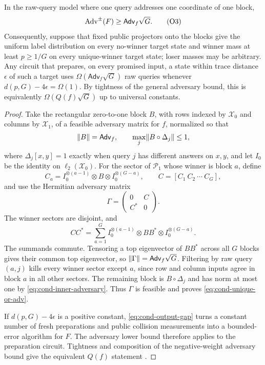 \begin{theorem}
\label{thm:cond-unique-or}
In the raw-query model where one query addresses one coordinate of one block,
\begin{equation*}
 \operatorname{Adv}^{\pm}(F)\ge \mathsf{Adv}_f\sqrt G.     \condtag{O3}\label{eq:cond-unique-or-adv}
\end{equation*}
Consequently, suppose that fixed public projectors onto the blocks give
the uniform label distribution on every no-winner target state and winner
mass at least $p\ge1/G$ on every unique-winner target state; loser masses
may be arbitrary.  Any circuit that prepares, on every promised input, a state
within trace distance $\epsilon$ of such a target uses
$\Omega(\mathsf{Adv}_f\sqrt G)$ raw queries whenever
$d(p,G)-4\epsilon=\Omega(1)$.  By tightness of the general adversary bound,
this is equivalently $\Omega(Q(f)\sqrt G)$ up to universal constants.
\end{theorem}

\begin{proof}
Take the rectangular zero-to-one block $B$, with rows indexed by
$\mathcal X_0$ and columns by $\mathcal X_1$, of a feasible adversary matrix
for $f$, normalized so that
\begin{equation}
 \lVert B\rVert=\mathsf{Adv}_f,\qquad
 \max_j\lVert B\circ\Delta_j\rVert\le1,                         \label{eq:cond-inner-adversary}
\end{equation}
where $\Delta_j[x,y]=1$ exactly when query $j$ has different answers on
$x,y$, and let $I_0$ be the identity on $\ell_2(\mathcal X_0)$.  For the
sector of $\mathcal P_1$ whose winner is block $a$, define
\[
 C_a=I_0^{\otimes(a-1)}\otimes B\otimes I_0^{\otimes(G-a)},
 \qquad C=[C_1\ C_2\ \cdots\ C_G],
\]
and use the Hermitian adversary matrix
\[
 \Gamma=\begin{pmatrix}0&C\\C^*&0\end{pmatrix}.
\]
The winner sectors are disjoint, and
\[
 CC^*=\sum_{a=1}^G I_0^{\otimes(a-1)}\otimes BB^*\otimes
                          I_0^{\otimes(G-a)}.
\]
The summands commute.  Tensoring a top eigenvector of $BB^*$ across all
$G$ blocks gives their common top eigenvector, so
$\lVert\Gamma\rVert=\mathsf{Adv}_f\sqrt G$.  Filtering by raw query $(a,j)$ kills every
winner sector except $a$, since row and column inputs agree in block $a$ in
all other sectors.  The remaining block is $B\circ\Delta_j$ and has norm at
most one by \eqref{eq:cond-inner-adversary}.  Thus $\Gamma$ is feasible and
proves \eqref{eq:cond-unique-or-adv}.

If $d(p,G)-4\epsilon$ is a positive constant,
\eqref{eq:cond-output-gap} turns a constant number of fresh preparations and
public collision measurements into a bounded-error algorithm for $F$.
The adversary lower bound therefore applies to the preparation circuit.
Tightness and composition of the negative-weight adversary bound give the
equivalent $Q(f)$ statement
\cite{hyer2005-tight-adversary-bounds-for-composite,lee2011-quantum-query-complexity-of-state,reichardt2011-reflections-for-quantum-query-algorithms}.
\end{proof}

